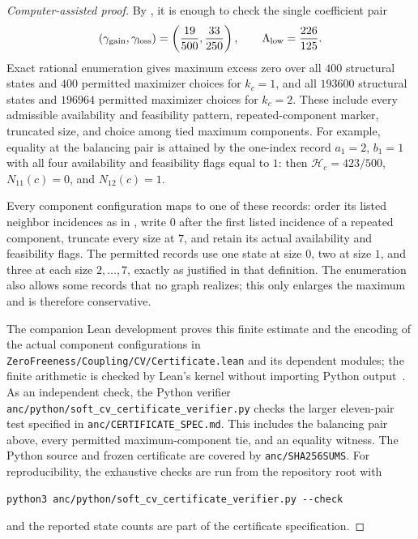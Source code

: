 \begin{proof}[Computer-assisted proof]
By , it is enough to check the single
coefficient pair
\[
 (\gamma_{\rm gain},\gamma_{\rm loss})
   =\left(\frac{19}{500},\frac{33}{250}\right),
 \qquad \Lambda_{\rm low}=\frac{226}{125}.
\]
Exact rational enumeration gives maximum excess zero over all $400$
structural states and $400$ permitted maximizer choices for $k_c=1$, and
all $193600$ structural states and $196964$ permitted maximizer choices for
$k_c=2$.  These include every admissible availability and feasibility
pattern, repeated-component marker, truncated size, and choice among tied
maximum components.
For example, equality at the balancing pair is attained by the one-index
record $a_1=2$, $b_1=1$ with all four availability and feasibility flags
equal to $1$: then $\mathcal H_c=423/500$, $N_{11}(c)=0$, and
$N_{12}(c)=1$.

Every component configuration maps to one of these records: order its listed
neighbor incidences as in , write $0$ after the
first listed incidence of a repeated component, truncate every size at $7$, and retain
its actual availability and feasibility flags.  The permitted records use
one state at size $0$, two at size $1$, and three at each size
$2,\ldots,7$, exactly as justified in that definition.  The enumeration
also allows some records that no graph realizes; this only enlarges the
maximum and is therefore conservative.

The companion Lean development proves this finite estimate and the
encoding of the actual component configurations in
\nolinkurl{ZeroFreeness/Coupling/CV/Certificate.lean} and its dependent modules;
the finite arithmetic is checked by Lean's kernel without importing
Python output~\cite{Shi2026Formalization}.
As an independent check, the Python verifier
\nolinkurl{anc/python/soft_cv_certificate_verifier.py} checks the larger
eleven-pair test specified in \texttt{anc/CERTIFICATE\_SPEC.md}.
This includes the balancing pair above, every permitted maximum-component
tie, and an equality witness.  The Python source and
frozen certificate are covered by \texttt{anc/SHA256SUMS}.
For reproducibility, the exhaustive checks are run from the repository root with
\begin{verbatim}
python3 anc/python/soft_cv_certificate_verifier.py --check
\end{verbatim}
and the reported state counts are part of the certificate specification.
\end{proof}


